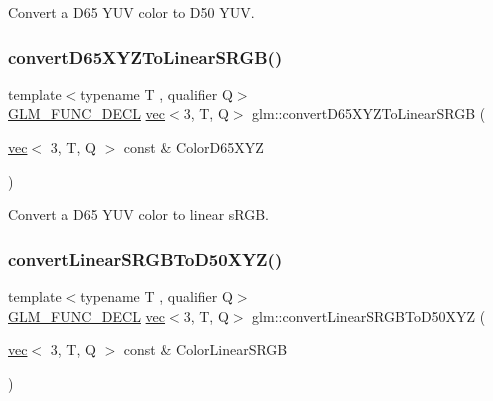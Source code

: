 Convert a D65 Y\+UV color to D50 Y\+UV. 

\mbox{\label{group__gtx__color__encoding_ga5265386fc3ac29e4c580d37ed470859c}} 
\subsubsection{\texorpdfstring{convert\+D65\+X\+Y\+Z\+To\+Linear\+S\+R\+G\+B()}{convertD65XYZToLinearSRGB()}}
{\footnotesize\ttfamily template$<$typename T , qualifier Q$>$ \\
\hyperlink{setup_8hpp_ab2d052de21a70539923e9bcbf6e83a51}{G\+L\+M\+\_\+\+F\+U\+N\+C\+\_\+\+D\+E\+CL} \hyperlink{structglm_1_1vec}{vec}$<$3, T, Q$>$ glm\+::convert\+D65\+X\+Y\+Z\+To\+Linear\+S\+R\+GB (\begin{DoxyParamCaption}\item[{\hyperlink{structglm_1_1vec}{vec}$<$ 3, T, Q $>$ const \&}]{Color\+D65\+X\+YZ }\end{DoxyParamCaption})}



Convert a D65 Y\+UV color to linear s\+R\+GB. 

\mbox{\label{group__gtx__color__encoding_ga1522ba180e3d83d554a734056da031f9}} 
\subsubsection{\texorpdfstring{convert\+Linear\+S\+R\+G\+B\+To\+D50\+X\+Y\+Z()}{convertLinearSRGBToD50XYZ()}}
{\footnotesize\ttfamily template$<$typename T , qualifier Q$>$ \\
\hyperlink{setup_8hpp_ab2d052de21a70539923e9bcbf6e83a51}{G\+L\+M\+\_\+\+F\+U\+N\+C\+\_\+\+D\+E\+CL} \hyperlink{structglm_1_1vec}{vec}$<$3, T, Q$>$ glm\+::convert\+Linear\+S\+R\+G\+B\+To\+D50\+X\+YZ (\begin{DoxyParamCaption}\item[{\hyperlink{structglm_1_1vec}{vec}$<$ 3, T, Q $>$ const \&}]{Color\+Linear\+S\+R\+GB }\end{DoxyParamCaption})}



